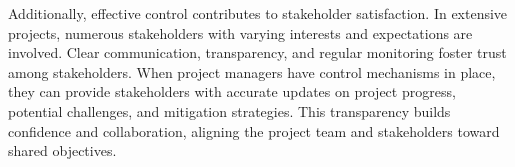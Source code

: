 \documentclass[runningheads]{llncs}
\begin{document}
Additionally, effective control contributes to stakeholder satisfaction. In extensive projects, numerous stakeholders with varying interests and expectations are involved. Clear communication, transparency, and regular monitoring foster trust among stakeholders. When project managers have control mechanisms in place, they can provide stakeholders with accurate updates on project progress, potential challenges, and mitigation strategies. This transparency builds confidence and collaboration, aligning the project team and stakeholders toward shared objectives.










\end{document}
